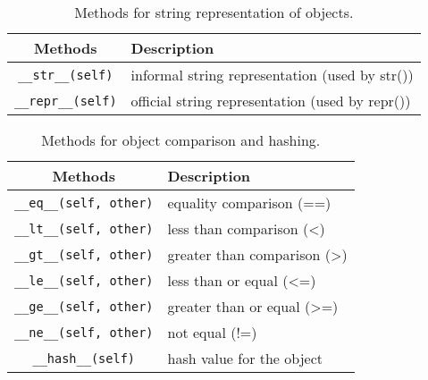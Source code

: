  \begin{definition}
    \begin{table}[H]
      \centering
      \begin{tabular}{|c|p{8cm}|}
        \hline
        \textbf{Methods} & \textbf{Description} \\
        \hline 
        \texttt{\_\_str\_\_(self)} & informal string representation (used by str()) \\
        \hline
        \texttt{\_\_repr\_\_(self)} & official string representation (used by repr()) \\
        \hline
      \end{tabular}
      \caption{Methods for string representation of objects.}
      \label{tab:string_representation}
    \end{table}
  \end{definition}

  \begin{definition}
    \begin{table}[H]
      \centering
      \begin{tabular}{|c|p{8cm}|}
        \hline
        \textbf{Methods} & \textbf{Description} \\
        \hline 
        \texttt{\_\_eq\_\_(self, other)} & equality comparison (==) \\
        \hline
        \texttt{\_\_lt\_\_(self, other)} & less than comparison (<) \\
        \hline
        \texttt{\_\_gt\_\_(self, other)} & greater than comparison (>) \\
        \hline
        \texttt{\_\_le\_\_(self, other)} & less than or equal (<=) \\
        \hline
        \texttt{\_\_ge\_\_(self, other)} & greater than or equal (>=) \\
        \hline
        \texttt{\_\_ne\_\_(self, other)} & not equal (!=) \\
        \hline
        \texttt{\_\_hash\_\_(self)} & hash value for the object \\
        \hline
      \end{tabular}
      \caption{Methods for object comparison and hashing.}
      \label{tab:comparison_hashing}
    \end{table}
  \end{definition}


